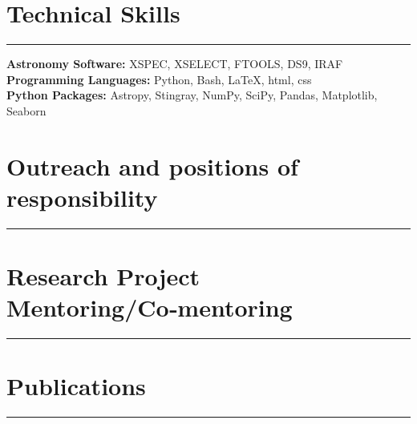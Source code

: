 \documentclass[12pt]{article}
\begin{document}
\vspace{0.7em}

\section*{Technical Skills}
\vspace{-0.5em}
\noindent\rule{\textwidth}{0.4pt}
\textbf{Astronomy Software:} XSPEC, XSELECT, FTOOLS, DS9, IRAF \\
\textbf{Programming Languages:} Python, Bash, \LaTeX, html, css \\
\textbf{Python Packages:} Astropy, Stingray, NumPy, SciPy, Pandas, Matplotlib, Seaborn \\

\vspace{0.7em}

\section*{Outreach and positions of responsibility}
\vspace{-0.5em}
\noindent\rule{\textwidth}{0.4pt}



\section*{Research Project Mentoring/Co‑mentoring}
\vspace{-0.5em}
\noindent\rule{\textwidth}{0.4pt}


\vspace{1em}




\section*{Publications}
\vspace{-0.5em}
\noindent\rule{\textwidth}{0.4pt}




\end{document}
